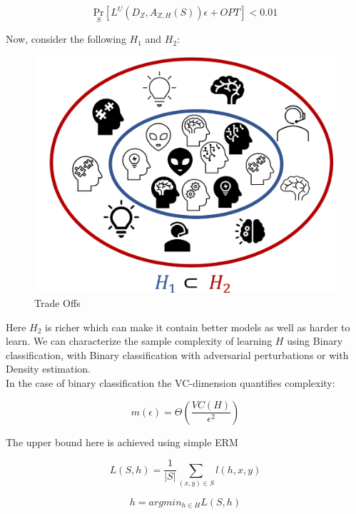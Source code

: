 \documentclass{article}
\begin{document}
\begin{equation}
    \underset{S}{\mathrm{Pr}} [L^U(D_Z, A_{Z,H}(S)) \epsilon + OPT] < 0.01
\end{equation}

\noindent Now, consider the following $H_1$ and $H_2$:

\begin{figure}[h]
\centering
\includegraphics[scale=0.6]{media/trade-off.png}
\caption{Trade Offs}
\label{fig:trade-off}
\end{figure}

\noindent Here $H_2$ is richer which can make it contain better models as well as harder to learn. We can characterize the sample complexity of learning $H$ using Binary classification, with Binary classification with
adversarial perturbations or with Density estimation.\\

\noindent In the case of binary classification the VC-dimension quantifies complexity:

\begin{equation*}
    m ( \epsilon ) = \Theta \left( \frac{VC(H)}{\epsilon^2} \right)
\end{equation*}

\noindent The upper bound here is achieved using simple ERM

\begin{equation*}
    L(S,h) = \frac{1}{|S|} \sum_{(x,y)\in S} l(h,x,y)
\end{equation*}

\begin{equation*}
    h = argmin_{h \in H} L(S,h)
\end{equation*}
\end{document}
